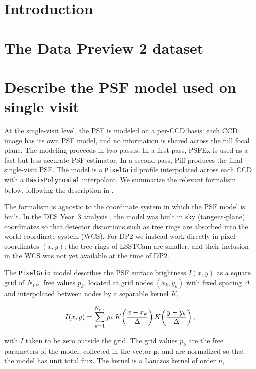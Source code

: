 \section{Introduction}

\section{The Data Preview 2 dataset}

\section{Describe the PSF model used on single visit}

At the single-visit level, the PSF is modeled on a per-CCD basis: each CCD image
has its own PSF model, and no information is shared across the full focal plane.
The modeling proceeds in two passes. In a first pass, PSFEx \REF is used as a
fast but less accurate PSF estimator. In a second pass, Piff \REF produces the
final single-visit PSF. The model is a \texttt{PixelGrid} profile interpolated
across each CCD with a \texttt{BasisPolynomial} interpolant. We summarize the
relevant formalism below, following the description in \REF.

The formalism is agnostic to the coordinate system in which the PSF model is
built. In the DES Year~3 analysis \REF, the model was built in sky
(tangent-plane) coordinates so that detector distortions such as tree rings are
absorbed into the world coordinate system (WCS). For DP2 we instead work
directly in pixel coordinates $(x,y)$: the tree rings of LSSTCam are smaller,
and their inclusion in the WCS was not yet available at the time of DP2.

The \texttt{PixelGrid} model describes the PSF surface brightness $I(x,y)$ as a
square grid of $N_{\rm pix}$ free values $p_k$, located at grid nodes
$(x_k,y_k)$ with fixed spacing $\Delta$ and interpolated between nodes by a
separable kernel $K$,

\begin{equation}
    I(x,y) = \sum_{k=1}^{N_{\rm pix}} p_k\,
             K\!\left(\frac{x-x_k}{\Delta}\right)
             K\!\left(\frac{y-y_k}{\Delta}\right),
    \label{eq:pixelgrid}
\end{equation}

with $I$ taken to be zero outside the grid. The grid values $p_k$ are the free
parameters of the model, collected in the vector $\mathbf{p}$, and are
normalized so that the model has unit total flux. The kernel is a Lanczos kernel
of order $n$,

